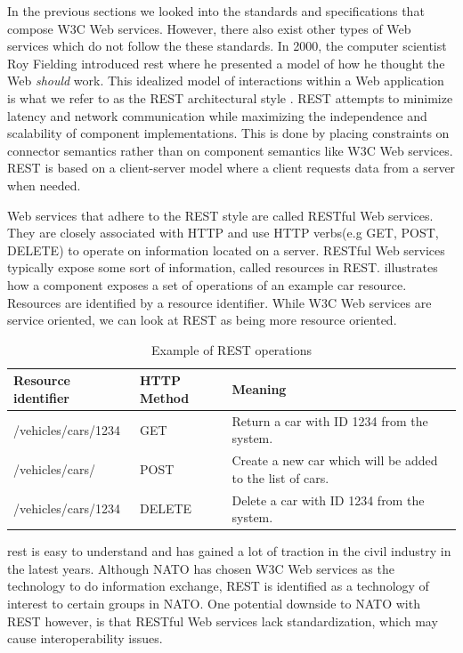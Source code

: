 In the previous sections we looked into the standards and specifications that
compose W3C Web services. However, there also exist other types of Web services
which do not follow the these standards. In 2000, the computer scientist Roy
Fielding introduced \gls{rest} where he presented a model of how he thought the
Web \textit{should} work. This idealized model of interactions within a Web
application is what we refer to as the REST architectural style
\cite{rest-fielding}. REST attempts to minimize latency and network
communication while maximizing the independence and scalability of component
implementations. This is done by placing constraints on connector semantics
rather than on component semantics like W3C Web services.  REST is based on a
client-server model where a client requests data from a server when needed.

Web services that adhere to the REST style are called RESTful Web services. They
are closely associated with HTTP and use HTTP verbs(e.g GET, POST, DELETE) to
operate on information located on a server. RESTful Web services typically
expose some sort of information, called resources in REST. 
illustrates how a component exposes a set of operations of an example car
resource. Resources are identified by a resource identifier. While W3C Web
services are service oriented, we can look at REST as being more resource
oriented.

 \begin{table}[h]
 \begin{tabularx}{\textwidth}{| X | X | X |}
 \hline
   \textbf{Resource identifier} & \textbf{HTTP Method}  & \textbf{Meaning}\\ \hline
   /vehicles/cars/1234 & GET & Return a car with ID 1234 from the system. \\ \hline
   /vehicles/cars/ & POST & Create a new car which will be added to the list of cars. \\ \hline
   /vehicles/cars/1234 & DELETE & Delete a car with ID 1234 from the system. \\ \hline
 \end{tabularx}
 \caption{Example of REST operations}
 \label{table-rest}
 \end{table}

 \gls{rest} is easy to understand and has gained a lot of traction in the civil
 industry in the latest years. Although NATO has chosen W3C Web services as the
 technology to do information exchange, REST is identified as a technology of
 interest to certain groups in
 NATO\cite{johnsen-bloebaum-recommendations-web-services-tactical-domain}. One
 potential downside to NATO with REST however, is that RESTful Web services lack
 standardization, which may cause interoperability issues.

